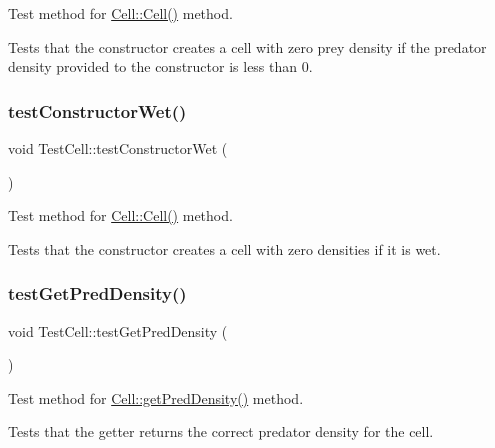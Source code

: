 Test method for \hyperlink{class_cell_afc0a4cece64b7689425fa81a4f6ef2e2}{Cell\+::\+Cell()} method. 

Tests that the constructor creates a cell with zero prey density if the predator density provided to the constructor is less than 0. \mbox{\label{class_test_cell_afa94f24a4f02e13167bfda0dd1516272}} 
\subsubsection{\texorpdfstring{test\+Constructor\+Wet()}{testConstructorWet()}}
{\footnotesize\ttfamily void Test\+Cell\+::test\+Constructor\+Wet (\begin{DoxyParamCaption}{ }\end{DoxyParamCaption})\hspace{0.3cm}{\ttfamily [protected]}}



Test method for \hyperlink{class_cell_afc0a4cece64b7689425fa81a4f6ef2e2}{Cell\+::\+Cell()} method. 

Tests that the constructor creates a cell with zero densities if it is wet. \mbox{\label{class_test_cell_addf9f8fe038ba0d1543b134b04c8b3c7}} 
\subsubsection{\texorpdfstring{test\+Get\+Pred\+Density()}{testGetPredDensity()}}
{\footnotesize\ttfamily void Test\+Cell\+::test\+Get\+Pred\+Density (\begin{DoxyParamCaption}{ }\end{DoxyParamCaption})\hspace{0.3cm}{\ttfamily [protected]}}



Test method for \hyperlink{class_cell_af5ff36a4a4025053127a4ad77efb103f}{Cell\+::get\+Pred\+Density()} method. 

Tests that the getter returns the correct predator density for the cell. \mbox{\label{class_test_cell_ae253f8668d2328e298a94ac745086689}} 
